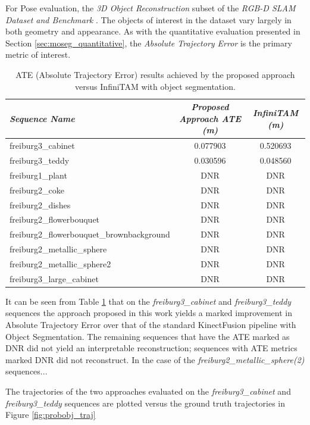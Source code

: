 For Pose evaluation, the \textit{3D Object Reconstruction} subset of the 
\textit{RGB-D SLAM Dataset and Benchmark} \cite{Sturm2012}. The objects of interest in 
the dataset vary largely in both geometry and appearance. As with the quantitative 
evaluation presented in Section \ref{sec:moseg_quantitative}, the 
\textit{Absolute Trajectory Error} is the primary metric of interest.

\begin{table}[ht]
  \label{tbl:probobj_ate}
  \centering
  \begin{tabular}{l@{\hskip 1cm} c c}
    \emph{Sequence Name} & \emph{Proposed Approach ATE (m)} & \emph{InfiniTAM (m)}\\
    \midrule
    \textsf{freiburg3\_cabinet} & 0.077903 & 0.520693\\
    \textsf{freiburg3\_teddy}   & 0.030596 & 0.048560 \\
    \textsf{freiburg1\_plant}   & DNR & DNR \\
    \textsf{freiburg2\_coke}   & DNR & DNR \\
    \textsf{freiburg2\_dishes}   & DNR & DNR \\
    \textsf{freiburg2\_flowerbouquet}   & DNR & DNR \\
    \textsf{freiburg2\_flowerbouquet\_brownbackground}   & DNR & DNR \\
    \textsf{freiburg2\_metallic\_sphere}   & DNR & DNR \\
    \textsf{freiburg2\_metallic\_sphere2}   & DNR & DNR \\
    \textsf{freiburg3\_large\_cabinet}   & DNR & DNR
  \end{tabular}
  \caption[Probabilistic Object Reconstruction ATE]
  {ATE (Absolute Trajectory Error) results achieved by the proposed approach versus 
  InfiniTAM with object segmentation.
  }
\end{table}

It can be seen from Table \ref{tbl:probobj_ate} that on the \textit{freiburg3\_cabinet} 
and \textit{\textsf{freiburg3\_teddy}} sequences the approach proposed in this work 
yields a marked improvement in Absolute Trajectory Error over that of the standard KinectFusion 
pipeline with Object Segmentation. The remaining sequences that have the ATE marked as DNR did 
not yield an interpretable reconstruction; sequences with ATE metrics marked DNR did not 
reconstruct. In the case of the \textit{freiburg2\_metallic\_sphere(2)} sequences...

The trajectories of the two approaches evaluated on the \textit{freiburg3\_cabinet} 
and \textit{\textsf{freiburg3\_teddy}} sequences are plotted versus the ground truth trajectories 
in Figure \ref{fig:probobj_traj}

